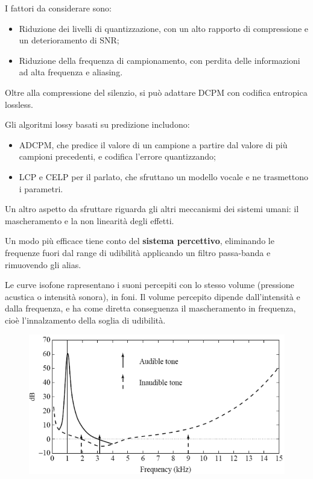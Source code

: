  I fattori da considerare sono:
 \begin{itemize}
 	\item Riduzione dei livelli di quantizzazione, con un alto rapporto di compressione e un deterioramento di SNR;
 	\item Riduzione della frequenza di campionamento, con perdita delle informazioni ad alta frequenza e aliasing.
 \end{itemize}

Oltre alla compressione del silenzio, si può adattare DCPM con codifica entropica lossless.

Gli algoritmi lossy basati su predizione includono:
\begin{itemize}
	\item ADCPM, che predice il valore di un campione a partire dal valore di più campioni precedenti, e codifica l'errore quantizzando;
	\item LCP e CELP per il parlato, che sfruttano un modello vocale e ne trasmettono i parametri.
\end{itemize}

Un altro aspetto da sfruttare riguarda gli altri meccanismi dei sistemi umani: il mascheramento e la non linearità degli effetti. 
 
Un modo più efficace tiene conto del \textbf{sistema percettivo}, eliminando le frequenze fuori dal range di udibilità applicando un filtro passa-banda e rimuovendo gli alias. 

Le curve isofone rapresentano i suoni percepiti con lo stesso volume (pressione acustica o intensità sonora), in foni. Il volume percepito dipende dall'intensità e dalla frequenza, e ha come diretta conseguenza il mascheramento in frequenza, cioè l'innalzamento della soglia di udibilità.

\begin{figure}[h]
	\centering
	\includegraphics[scale=0.6]{Lezioni/Immagini/mascheramento}
\end{figure}
 
